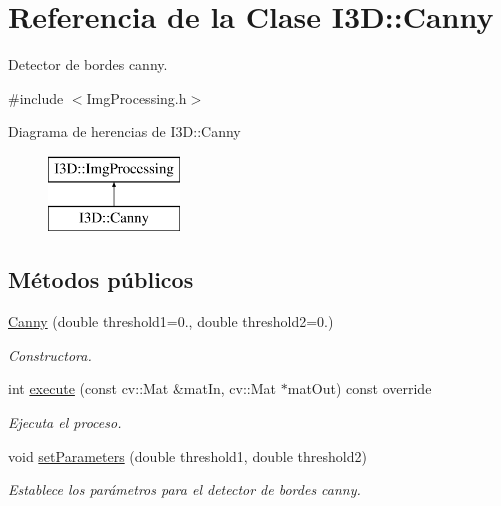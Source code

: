 \hypertarget{class_i3_d_1_1_canny}{}\section{Referencia de la Clase I3D\+:\+:Canny}
\label{class_i3_d_1_1_canny}


Detector de bordes canny.  




{\ttfamily \#include $<$Img\+Processing.\+h$>$}

Diagrama de herencias de I3D\+:\+:Canny\begin{figure}[H]
\begin{center}
\leavevmode
\includegraphics[height=2.000000cm]{class_i3_d_1_1_canny}
\end{center}
\end{figure}
\subsection*{Métodos públicos}
\begin{DoxyCompactItemize}
\item 
\hyperlink{class_i3_d_1_1_canny_a9dd626da444b5d71b001b458081f6af7}{Canny} (double threshold1=0., double threshold2=0.)
\begin{DoxyCompactList}\small\item\em Constructora. \end{DoxyCompactList}\item 
int \hyperlink{class_i3_d_1_1_canny_a5337ec2dd0c95fe7c9d05444ed8f6425}{execute} (const cv\+::\+Mat \&mat\+In, cv\+::\+Mat $\ast$mat\+Out) const  override
\begin{DoxyCompactList}\small\item\em Ejecuta el proceso. \end{DoxyCompactList}\item 
void \hyperlink{class_i3_d_1_1_canny_afb3f99083d17f060fe791e8498a7d4a7}{set\+Parameters} (double threshold1, double threshold2)
\begin{DoxyCompactList}\small\item\em Establece los parámetros para el detector de bordes canny. \end{DoxyCompactList}\end{DoxyCompactItemize}
